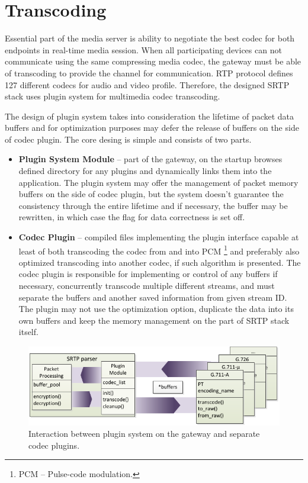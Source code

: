 \section{Transcoding}
Essential part of the media server is ability to negotiate the best codec for
both endpoints in real-time media session. When all participating devices can
not communicate using the same compressing media codec, the gateway must be able
of transcoding to provide the channel for communication. RTP protocol defines
127 different codecs for audio and video profile. Therefore, the designed 
SRTP stack uses plugin system for multimedia codec transcoding.

The design of plugin system takes into consideration the lifetime of packet data 
buffers and  for optimization purposes may defer the release of buffers on the 
side of codec plugin. The core desing is simple and consists of two parts.

\begin{itemize}
\item \textbf{Plugin System Module} -- part of the gateway, on the startup 
browses defined directory for any plugins and dynamically links them into the 
application. The plugin system may offer the management of packet memory buffers
on the side of codec plugin, but the system doesn't guarantee the consistency 
through the entire lifetime and if necessary, the buffer may be rewritten, in 
which case the flag for data correctness is set off. 
\item \textbf{Codec Plugin} -- compiled files implementing the plugin interface
capable at least of both transcoding the codec from and into PCM \footnote{ PCM 
-- Pulse-code modulation.} and preferably also optimized transcoding into
another codec, if such algorithm is presented. The codec plugin is responsible
for implementing or control of any buffers if necessary, concurrently transcode 
multiple different streams, and must separate the buffers and another saved 
information from given stream ID. The plugin may not use the optimization 
option, duplicate the data into its own buffers and keep the memory management
on the part of SRTP stack itself.  
\end{itemize}  

\begin{figure}[H]
\centering
\includegraphics[width=15cm]{fig/plugins.pdf}
\caption[Plugin system design]{Interaction between plugin system on the gateway 
and separate codec plugins.}
\label{pt_payload}
\end{figure} 


